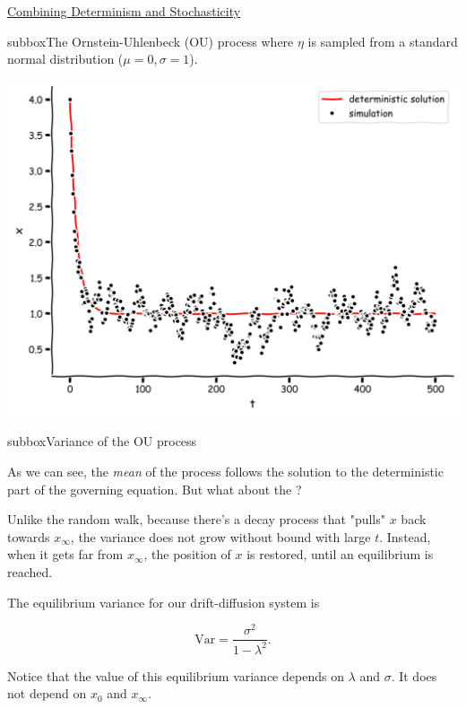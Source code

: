 \begin{textbox}{\href{https://compneuro.neuromatch.io/tutorials/W2D2_LinearSystems/student/W2D2_Tutorial3.html}{Combining Determinism and Stochasticity } }
\begin{subbox}{subbox}{The Ornstein-Uhlenbeck (OU) process}
where $\eta$ is sampled from a standard normal distribution ($\mu=0, \sigma=1$). 
\begin{center}
\includegraphics[scale=0.08]{Figures/LS/CDS_Figure7.png}
\end{center}
\end{subbox}
\begin{subbox}{subbox}{Variance of the OU process}
\scriptsize

As we can see, the \textit{mean} of the process follows the solution to the deterministic part of the governing equation. But what about the ? 

Unlike the random walk, because there's a decay process that "pulls" $x$ back towards $x_\infty$, the variance does not grow without bound with large $t$. Instead, when it gets far from $x_\infty$, the position of $x$ is restored, until an equilibrium is reached.

The equilibrium variance for our drift-diffusion system is

\[\text{Var} = \frac{\sigma^2}{1 - \lambda^2}.\]

Notice that the value of this equilibrium variance depends on $\lambda$ and $\sigma$. It does not depend on $x_0$ and $x_\infty$.

\end{subbox}

\end{textbox}
